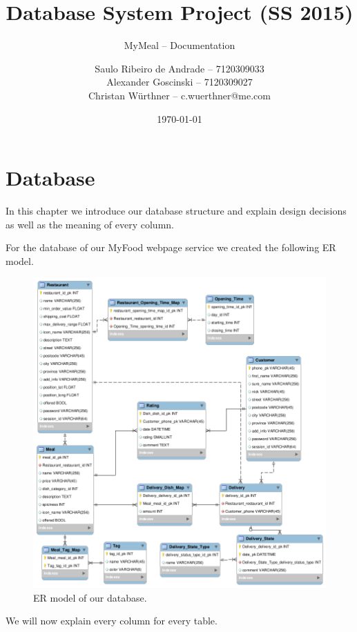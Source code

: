 \documentclass[parskip=half, a4paper, DIV=14]{scrartcl}
\begin{document}
\title{Database System Project (SS 2015)}
\subtitle{MyMeal -- Documentation}
\author{Saulo Ribeiro de Andrade -- 7120309033\\
		Alexander Goscinski -- 7120309027\\
		Christan Würthner -- c.wuerthner@me.com}
\date{\today}
\maketitle

\tableofcontents
\newpage


\section{Database}
In this chapter we introduce our database structure and explain design decisions as well as the meaning of every column.

For the database of our MyFood webpage service we created the following ER model.
\begin{figure}[h!]
	\centering
		\includegraphics[scale=0.5]{er_model.png}
	\caption{ER model of our database.}
\end{figure}

We will now explain every column for every table.
\end{document}
